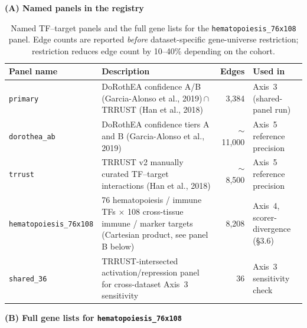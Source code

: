 \documentclass[a4paper,11pt]{article}
\begin{document}
\begin{table}[ht]
\centering
\caption{Named TF--target panels and the full gene lists for the
\texttt{hematopoiesis\_76x108} panel. Edge counts are reported
\emph{before} dataset-specific gene-universe restriction; restriction
reduces edge count by 10--40\% depending on the cohort.}
\label{tab:s1}
\small

\textbf{(A) Named panels in the registry}

\begin{tabularx}{\textwidth}{l X r l}
\toprule
\textbf{Panel name} & \textbf{Description} & \textbf{Edges} & \textbf{Used in} \\
\midrule
\texttt{primary} &
  DoRothEA confidence A/B (Garcia-Alonso et al., 2019)\,$\cap$\,TRRUST
  (Han et al., 2018) &
  3{,}384 & Axis~3 (shared-panel run) \\
\addlinespace
\texttt{dorothea\_ab} &
  DoRothEA confidence tiers A and B (Garcia-Alonso et al., 2019) &
  $\sim$11{,}000 & Axis~5 reference precision \\
\addlinespace
\texttt{trrust} &
  TRRUST v2 manually curated TF--target interactions (Han et al., 2018) &
  $\sim$8{,}500 & Axis~5 reference precision \\
\addlinespace
\texttt{hematopoiesis\_76x108} &
  76 hematopoiesis / immune TFs $\times$ 108 cross-tissue immune /
  marker targets (Cartesian product, see panel B below) &
  8{,}208 & Axis~4, scorer-divergence (\S3.6) \\
\addlinespace
\texttt{shared\_36} &
  TRRUST-intersected activation/repression panel for cross-dataset
  Axis~3 sensitivity &
  36 & Axis~3 sensitivity check \\
\bottomrule
\end{tabularx}

\vspace{1em}
\textbf{(B) Full gene lists for \texttt{hematopoiesis\_76x108}}


\end{table}
\end{document}
